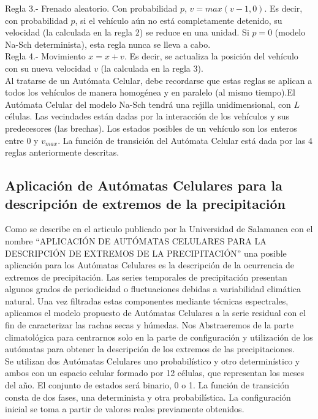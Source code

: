 Regla 3.- Frenado aleatorio. Con probabilidad $p$, $ v=max(v-1,0)$. Es decir, con probabilidad $p$, si el vehículo aún no está completamente detenido, su velocidad (la calculada en la regla 2) se reduce en una unidad. Si $p=0$ (modelo Na-Sch determinista), esta regla nunca se lleva a cabo.\\

Regla 4.- Movimiento $ x=x+v$. Es decir, se actualiza la posición del vehículo con su nueva velocidad $v$ (la calculada en la regla 3).\\
 
Al tratarse de un Autómata Celular, debe recordarse que estas reglas se aplican a todos los vehículos de manera homogénea y en paralelo (al mismo tiempo).El Autómata Celular del modelo Na-Sch tendrá una rejilla unidimensional, con $L$ células. Las vecindades están dadas por la interacción de los vehículos y sus predecesores (las brechas). Los estados posibles de un vehículo son los enteros entre 0 y $v_{max}$. La función de transición del Autómata Celular está dada por las 4 reglas anteriormente descritas. \cite{trafico}
 
 
\subsection{Aplicación de Autómatas Celulares para la descripción de extremos de la precipitación}
Como se describe en el articulo publicado por la Universidad de Salamanca con el nombre ``APLICACIÓN DE AUTÓMATAS CELULARES PARA LA DESCRIPCIÓN DE EXTREMOS DE LA PRECIPITACIÓN'' una posible aplicación para los Autómatas Celulares es la descripción de la ocurrencia de extremos de precipitación. Las series temporales de precipitación presentan algunos grados de periodicidad o fluctuaciones debidas a variabilidad climática natural. Una vez filtradas estas componentes mediante técnicas espectrales, aplicamos el modelo propuesto de Autómatas Celulares a la serie residual con el fin de caracterizar las rachas secas y húmedas.
Nos Abstraeremos de la parte climatológica para centrarnos solo en la parte de configuración y utilización de los autómatas para obtener la descripción de los extremos de las precipitaciones.\\

Se utilizan dos Autómatas Celulares uno probabilístico y otro
determinístico y ambos con un espacio celular formado por 12 células, que representan los meses del año. El conjunto de estados será binario, 0 o 1. La función de transición consta de dos fases, una determinista y otra probabilística. La configuración inicial se toma a partir de valores reales previamente obtenidos. \\

